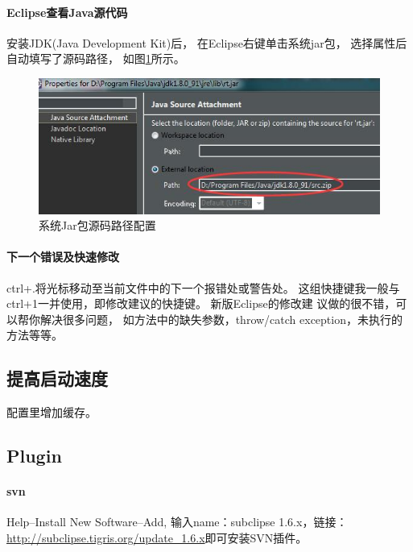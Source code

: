 \documentclass{book}
\begin{document}
\paragraph{Eclipse查看Java源代码}

安装JDK(Java Development Kit)后，
在Eclipse右键单击系统jar包，
选择属性后自动填写了源码路径，
如图\ref{code:JavaJarSourceCodeConfiguration}所示。

\begin{figure}[htbp]
	\centering
	\includegraphics[scale=0.5]{JavaJarSourceCodeConfiguration.jpg}
	\caption{系统Jar包源码路径配置}
	\label{code:JavaJarSourceCodeConfiguration}
\end{figure}

\paragraph{下一个错误及快速修改}

ctrl+.将光标移动至当前文件中的下一个报错处或警告处。
这组快捷键我一般与ctrl+1一并使用，即修改建议的快捷键。
新版Eclipse的修改建 议做的很不错，可以帮你解决很多问题，
如方法中的缺失参数，throw/catch exception，未执行的方法等等。

\subsection{提高启动速度}

配置里增加缓存。

\subsection{Plugin}

\paragraph{svn}

Help--Install New Software--Add,
输入name：subclipse 1.6.x，链接：\url{http://subclipse.tigris.org/update_1.6.x}即可安装SVN插件。
\end{document}
